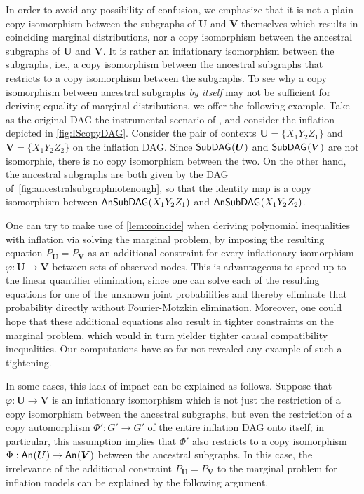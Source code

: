 \documentclass[aps,english,10pt,superscriptaddress,onecolumn,twoside,longbibliography,pra,floatfix,fleqn,nofootinbib]{revtex4-1}%
\theoremstyle{definition}
\newcounter{example}[section]
\newcommand{\An}[2][]{{\mathsf{An}_{#1}}\parenths{#2}}
\newcommand{\SmallNamedFunction}[3][]{\operatorname{\mathsf{#2}}_{#1}\parenths{#3}}
\newcommand{\subgraph}[2][]{\SmallNamedFunction[#1]{SubDAG}{#2}}
\newcommand{\ansubgraph}[2][]{\SmallNamedFunction[#1]{AnSubDAG}{#2}}
\DeclarePairedDelimiter{\parenths}{\lparen}{\rparen}
\begin{document}
In order to avoid any possibility of confusion, we emphasize that it is not a plain copy isomorphism between the subgraphs of $\bm{U}$ and $\bm{V}$ themselves which results in coinciding marginal distributions, nor a copy isomorphism between the ancestral subgraphs of $\bm{U}$ and $\bm{V}$. It is rather an inflationary isomorphism between the subgraphs, i.e., a copy isomorphism between the ancestral subgraphs that restricts to a copy isomorphism between the subgraphs. To see why a copy isomorphism between ancestral subgraphs {\em by itself} may not be sufficient for deriving equality of marginal distributions, we offer the following example. Take as the original DAG the instrumental scenario of \citet{pearl1995instrumental}, and consider the inflation depicted in \cref{fig:IScopyDAG}.  Consider the pair of contexts $\bm{U} = \{ X_1 Y_2 Z_1\}$ and $\bm{V}= \{ X_1 Y_2 Z_2\}$ on the inflation DAG. Since $\subgraph{\bm{U}}$ and $\subgraph{\bm{V}}$ are not isomorphic, there is no copy isomorphism between the two. On the other hand, 
the ancestral subgraphs are both given by the DAG of~\cref{fig:ancestralsubgraphnotenough}, so that the identity map is a copy isomorphism between $\ansubgraph{X_1 Y_2 Z_1}$ and $\ansubgraph{X_1 Y_2 Z_2}$.

One can try to make use of \cref{lem:coincide} when deriving polynomial inequalities with inflation via solving the marginal problem, by imposing the resulting equation $P_{\bm{U}} = P_{\bm{V}}$ as an additional constraint for every inflationary isomorphism $\varphi : \bm{U}\to\bm{V}$ between sets of observed nodes. This is advantageous to speed up to the linear quantifier elimination, since one can solve each of the resulting equations for one of the unknown joint probabilities and thereby eliminate that probability directly without Fourier-Motzkin elimination. Moreover, one could hope that these additional equations also result in tighter constraints on the marginal problem, which would in turn yielder tighter causal compatibility inequalities. Our computations have so far not revealed any example of such a tightening.

In some cases, this lack of impact can be explained as follows.
Suppose that $\varphi:\bm{U}\to\bm{V}$ is an inflationary isomorphism 
which is not just the restriction of a copy isomorphism between the ancestral subgraphs, but even the restriction of a copy automorphism 
$\Phi':G'\to G'$ of the entire inflation DAG onto itself; in particular, this assumption implies that $\Phi'$ also restricts to a copy isomorphism $\Phi:\An{\bm{U}}\to\An{\bm{V}}$ between the ancestral subgraphs. In this case, the irrelevance of the additional constraint $P_{\bm{U}} = P_{\bm{V}}$ to the marginal problem for inflation models can be explained by the following argument. 
\end{document}
